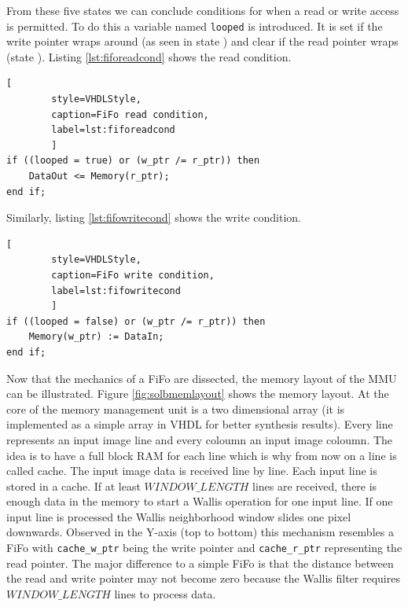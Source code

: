 From these five states we can conclude conditions for when a read or write access is
permitted. To do this a variable named \texttt{looped} is introduced. It is set
if the write pointer wraps around (as seen in state ) and clear if the
read pointer wraps (state ). Listing \ref{lst:fiforeadcond} shows the
read condition.

\begin{minipage}{\linewidth}
    \begin{lstlisting}[
        style=VHDLStyle, 
        caption=FiFo read condition, 
        label=lst:fiforeadcond
        ]
if ((looped = true) or (w_ptr /= r_ptr)) then
    DataOut <= Memory(r_ptr);
end if;\end{lstlisting}
\end{minipage}

Similarly, listing \ref{lst:fifowritecond} shows the write condition.

\begin{minipage}{\linewidth}
    \begin{lstlisting}[
        style=VHDLStyle, 
        caption=FiFo write condition, 
        label=lst:fifowritecond
        ]
if ((looped = false) or (w_ptr /= r_ptr)) then
    Memory(w_ptr) := DataIn;
end if;\end{lstlisting}
\end{minipage}

Now that the mechanics of a FiFo are dissected, the memory layout of the
MMU can be illustrated. Figure \ref{fig:solbmemlayout} shows the memory layout.
At the core of the memory management unit is a two
dimensional array (it is implemented as a simple array in VHDL for better
synthesis results). Every line represents an input image line and every coloumn an
input
image coloumn. The idea is to have a full block RAM for each line which is why
from now on a line is called cache. The input image data is received line by
line. Each input line is stored in a cache. If at least $WINDOW\_LENGTH$ lines
are received, there is enough data in the memory to start a Wallis operation for
one input line. If one input line is processed the Wallis neighborhood
window slides one pixel downwards. Observed in the Y-axis (top to bottom) this
mechanism resembles
a FiFo with \texttt{cache\_w\_ptr} being the write pointer and 
\texttt{cache\_r\_ptr} representing the read pointer. The major difference to a
simple FiFo is that the distance between the read and write pointer may not
become zero because the Wallis filter requires $WINDOW\_LENGTH$ lines to process
data.

